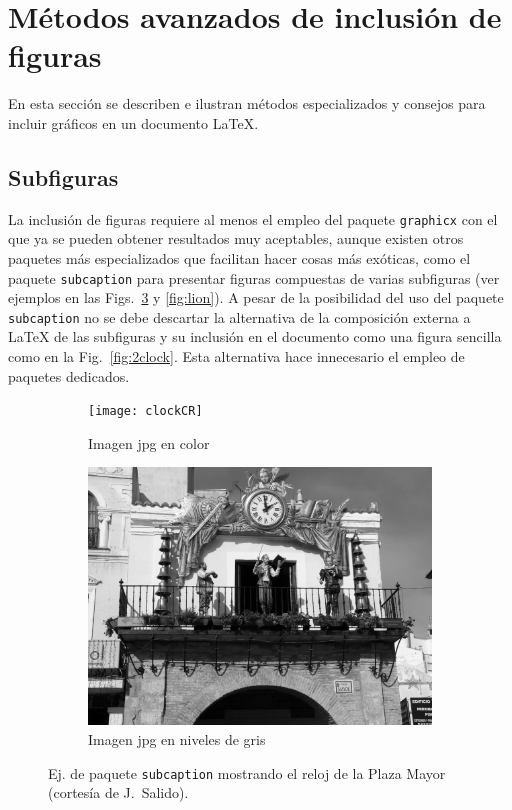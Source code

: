 \documentclass[ 		%
	11pt,				%
	a4paper,			%
	twoside,			%
	openright,			%
	final       		%
]{book}
\begin{document}
\section{Métodos avanzados de inclusión de figuras}
En esta sección se describen e ilustran métodos especializados y consejos para incluir gráficos en un documento \LaTeX.


\subsection{Subfiguras}
La inclusión de figuras requiere al menos el empleo del paquete \texttt{graphicx} con el que ya se pueden obtener resultados muy aceptables, aunque existen otros paquetes más especializados que facilitan hacer cosas más exóticas, como el paquete \texttt{subcaption} para presentar figuras compuestas de varias subfiguras (ver ejemplos en las Figs.~\ref{fig:clock} y \ref{fig:lion}). A pesar de la posibilidad del uso del paquete \texttt{subcaption} no se debe descartar la alternativa de la composición externa a \LaTeX{} de las subfiguras y su inclusión en el documento como una figura sencilla como en la Fig.~\ref{fig:2clock}. Esta alternativa hace innecesario el empleo de paquetes dedicados.

\begin{figure}[hbt]
	\centering
	\begin{subfigure}[b]{0.48\textwidth}
		\centering
		\texttt{[image: clockCR]}
		\caption{Imagen jpg en color}\label{fig:clockCR}
	\end{subfigure}
	\begin{subfigure}[b]{0.48\textwidth}
		\centering
		\includegraphics[width=\textwidth]{clockCRbw}
		\caption{Imagen jpg en niveles de gris}\label{fig:clockCRbw}
	\end{subfigure}
	\caption[Comparación jpg color y niveles de gris]{Ej. de paquete \texttt{subcaption} mostrando el reloj de la Plaza Mayor (cortesía de J.~Salido).}
	\label{fig:clock}
\end{figure}
\end{document}
